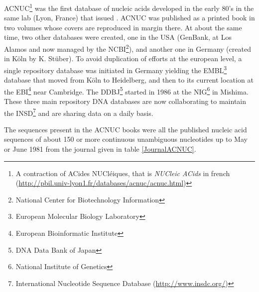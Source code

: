 \documentclass{article}
\begin{document}
ACNUC\footnote{%
A contraction of ACides NUCl{\'e}iques, that is \emph{NUCleic ACids} in french (\url{http://pbil.univ-lyon1.fr/databases/acnuc/acnuc.html})}
was the first database of nucleic acids developed in the early 80's in the same lab (Lyon, France) that issued \seqinr{}. ACNUC was  published as a printed book in two volumes \cite{GautierC1982a, GautierC1982b} whose covers are reproduced in margin there. At about the same time, two other databases were created, one in the USA (GenBank, at Los Alamos and now managed by the NCBI\footnote{National Center for Biotechnology Information}), and another one in Germany (created in K{\"o}ln by K. St{\"u}ber). To avoid duplication of efforts at the european level, a single repository database was initiated in Germany yielding the EMBL\footnote{European Molecular Biology Laboratory} database that moved from K{\"o}ln to Heidelberg, and then to its current location at the EBI\footnote{%
European Bioinformatic Institute} 
near Cambridge. The DDBJ\footnote{%
DNA Data Bank of Japan} 
started in 1986 at the NIG\footnote{National Institute of Genetics} in Mishima. These three
main repository DNA databases are now collaborating to maintain the INSD\footnote{
International Nucleotide Sequence Database (\url{http://www.insdc.org/})} 
and are sharing data on a daily basis.


The sequences present in the ACNUC books \cite{GautierC1982a, GautierC1982b} were all
the published nucleic acid sequences of about 150 or more continuous
unambiguous nucleotides up to May or June 1981 from the journal given in
table \ref{JournalACNUC}.
\end{document}
